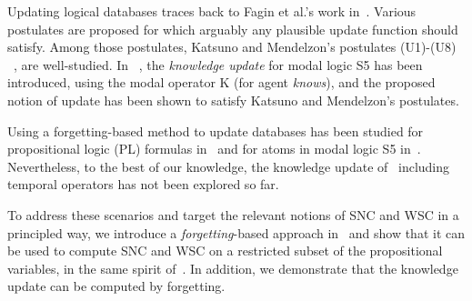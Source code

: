 \documentclass[twoside,11pt]{article}
\begin{document}
Updating logical databases  traces back to Fagin et al.'s work in~\cite{DBLP:journals/acr/FaginKUV86}.
Various postulates are proposed for which arguably any plausible update function should satisfy. Among those postulates,  Katsuno and Mendelzon's postulates (U1)-(U8) ~\cite{katsuno91mendelzon}, are well-studied.
In ~\cite{baral2005knowledge}, the \emph{knowledge update} for modal logic S5 has been introduced, using the modal operator K (for agent \emph{knows}), and the proposed notion of update has been shown to satisfy Katsuno and Mendelzon's postulates.

Using a forgetting-based method to update databases has been studied for propositional logic (PL) formulas in~\cite{DBLP:conf/aaai/FangWLFL18} and for atoms in modal logic S5 in~\cite{Yan:AIJ:2009}.
Nevertheless, to the best of our knowledge, the knowledge update of \CTL\ including temporal operators has not been explored so far.

To address these scenarios and target the relevant notions of SNC and WSC in a principled way,
we introduce a \emph{forgetting}-based approach in \CTL\ and show that it can
be used to compute SNC and WSC on a restricted subset of the propositional variables, in the same spirit of~\cite{DBLP:Lin:AIJ:2001,DBLP:conf/ijcai/DohertyLS01}.
In addition, we demonstrate that the knowledge update can  be computed by forgetting.
\end{document}
